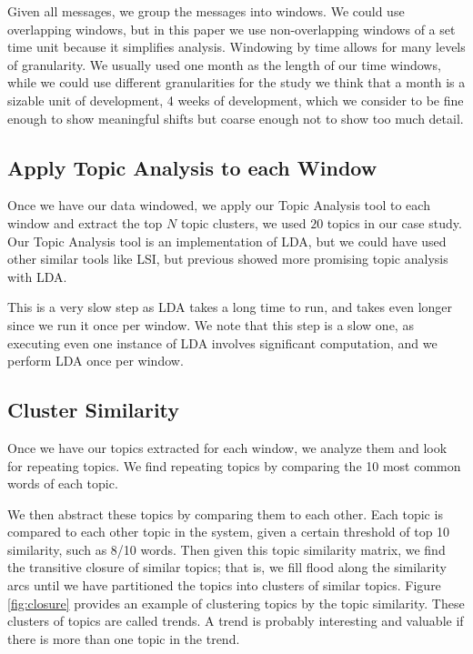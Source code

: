 \documentclass[times, 10pt,twocolumn]{article}
\begin{document}
Given all messages, we group the messages into windows. We could use
overlapping windows, but in this paper we use non-overlapping windows
of a set time unit because it simplifies analysis.  Windowing by time
allows for many levels of granularity. We usually used one month as
the length of our time windows, while we could use different
granularities for the study we think that a month is a sizable unit of
development, 4 weeks of development, which we consider to be fine
enough to show meaningful shifts but coarse enough not to show too
much detail.

\subsection{Apply Topic Analysis to each Window}

Once we have our data windowed, we apply our Topic Analysis tool to
each window and extract the top $N$ topic clusters, we used $20$
topics in our case study. Our Topic Analysis tool is an implementation
of LDA, but we could have used other similar tools like LSI, but
previous showed more promising topic analysis with LDA.

This is a very slow step as LDA takes a long time to run, and takes
even longer since we run it once per window. We note that this step is
a slow one, as executing even one instance of LDA involves significant
computation, and we perform LDA once per window.





\subsection{Cluster Similarity}


Once we have our topics extracted for each window, we analyze them and
look for repeating topics. We find repeating topics by comparing the
10 most common words of each topic.

We then abstract these topics by comparing them to each other.  Each
topic is compared to each other topic in the system, given a certain
threshold of top 10 similarity, such as 8/10 words. Then given this topic
similarity matrix, we find the transitive closure of similar topics;
that is, we fill flood along the similarity arcs until we have
partitioned the topics into clusters of similar topics. Figure
\ref{fig:closure} provides an example of clustering topics by the
topic similarity. These clusters of topics are called trends. A trend
is probably interesting and valuable if there is more than one topic in
the trend.
\end{document}

